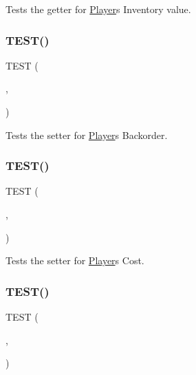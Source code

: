 Tests the getter for \hyperlink{classPlayer}{Player}\textquotesingle{}s Inventory value. \mbox{\label{group__group1_gabbb58f0693c71f814d008f249c62f0d0}} 
\subsubsection{\texorpdfstring{T\+E\+S\+T()}{TEST()}\hspace{0.1cm}{\footnotesize\ttfamily [10/18]}}
{\footnotesize\ttfamily T\+E\+ST (\begin{DoxyParamCaption}\item[{player\+Test}]{,  }\item[{set\+Backorder\+Test}]{ }\end{DoxyParamCaption})}

Tests the setter for \hyperlink{classPlayer}{Player}\textquotesingle{}s Backorder. \mbox{\label{group__group1_gaac7c46446cc5f1a91bc29cc5b6c4675f}} 
\subsubsection{\texorpdfstring{T\+E\+S\+T()}{TEST()}\hspace{0.1cm}{\footnotesize\ttfamily [11/18]}}
{\footnotesize\ttfamily T\+E\+ST (\begin{DoxyParamCaption}\item[{player\+Test}]{,  }\item[{set\+Cost\+Test}]{ }\end{DoxyParamCaption})}

Tests the setter for \hyperlink{classPlayer}{Player}\textquotesingle{}s Cost. \mbox{\label{group__group1_ga01d81b8c2f8950e855f2d0086acbd722}} 
\subsubsection{\texorpdfstring{T\+E\+S\+T()}{TEST()}\hspace{0.1cm}{\footnotesize\ttfamily [12/18]}}
{\footnotesize\ttfamily T\+E\+ST (\begin{DoxyParamCaption}\item[{player\+Test}]{,  }\item[{set\+Inventory\+Test}]{ }\end{DoxyParamCaption})}

